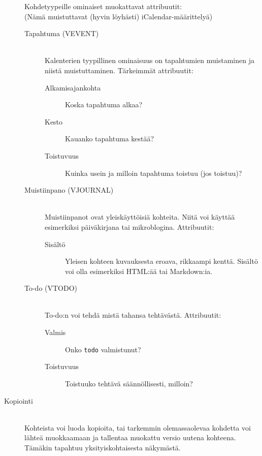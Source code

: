 \documentclass[a4paper,12pt]{report}
\begin{document}
\begin{description}
      Kohdetyypeille ominaiset muokattavat attribuutit:
      \\(Nämä muistuttavat (hyvin löyhästi) iCalendar-määrittelyä)
      \begin{description}
         \item[Tapahtuma (VEVENT)] \hfill\\
            Kalenterien tyypillinen ominaisuus on tapahtumien muistaminen ja
            niistä muistuttaminen. Tärkeimmät attribuutit:
            \begin{description}
               \item[Alkamisajankohta]  Koska tapahtuma alkaa?
               \item[Kesto]  Kauanko tapahtuma kestää?
               \item[Toistuvuus] Kuinka usein ja milloin tapahtuma toistuu (jos
                  toistuu)?
            \end{description}

         \item[Muistiinpano (VJOURNAL)] \hfill\\
            Muistiinpanot ovat yleiskäyttöisiä
            kohteita.  Niitä voi käyttää esimerkiksi päiväkirjana tai
            mikroblogina. Attribuutit:
            \begin{description}
               \item[Sisältö] Yleisen kohteen kuvauksesta eroava, rikkaampi
                  kenttä. Sisältö voi olla esimerkiksi HTML:ää tai Markdown:ia.
            \end{description}

         \item[To-do (VTODO)] \hfill\\
            To-do:n voi tehdä mistä tahansa tehtävästä. Attribuutit:
            \begin{description}
               \item[Valmis] Onko \texttt{todo} valmistunut?
               \item[Toistuvuus] Toistuuko tehtävä säännöllisesti, milloin?
            \end{description}
      \end{description}

   \item[Kopiointi]\hfill\\
      Kohteista voi luoda kopioita, tai tarkemmin olemassa\-olevaa kohdetta voi
      läh\-teä muokkaamaan ja tallentaa muokattu versio uutena kohteena. Tämäkin
      tapahtuu yksityiskohtaisesta näkymästä.


\end{description}
\end{document}
